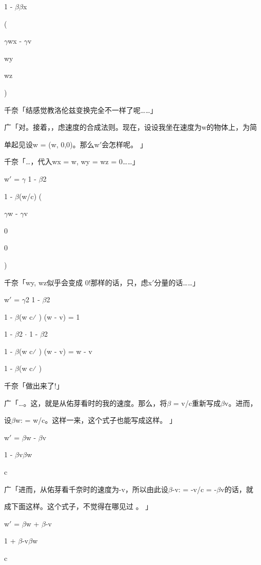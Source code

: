 1 - $\beta$$\beta$x\par
(\par
$\gamma$wx - $\gamma$v\par
wy\par
wz\par
)\par
千奈「结感觉教洛伦兹变换完全不一样了呢……」\par
广「对。接着，，虑速度的合成法则。现在，设设我坐在速度为w的物体上，为简\par
单起见设w = (w, 0,0)。那么w$\prime$会怎样呢。 」\par
千奈「…，代入wx = w, wy = wz = 0……」\par
w$\prime$ = $\gamma$ 1 - $\beta$2\par
1 - $\beta$(w/c) (\par
$\gamma$w - $\gamma$v\par
0\par
0\par
)\par
千奈「wy, wz似乎会变成 0!那样的话，只，虑x$\prime$分量的话……」\par
w$\prime$ = $\gamma$2 1 - $\beta$2\par
1 - $\beta$(w c⁄ ) (w - v) = 1\par
1 - $\beta$2 $\cdot$ 1 - $\beta$2\par
1 - $\beta$(w c⁄ ) (w - v) = w - v\par
1 - $\beta$(w c⁄ )\par
千奈「做出来了!」\par
广「…。这，就是从佑芽看时的我的速度。那么，将$\beta$ = v/c重新写成$\beta$v。进而，\par
设$\beta$w: = w/c。这样一来，这个式子也能写成这样。 」\par
w$\prime$ = $\beta$w - $\beta$v\par
1 - $\beta$v$\beta$w\par
c\par
广「进而，从佑芽看千奈时的速度为-v，所以由此设$\beta$-v: = -v/c = -$\beta$v的话，就\par
成下面这样。这个式子，不觉得在哪见过 。 」\par
w$\prime$ = $\beta$w + $\beta$-v\par
1 + $\beta$-v$\beta$w\par
c\par

